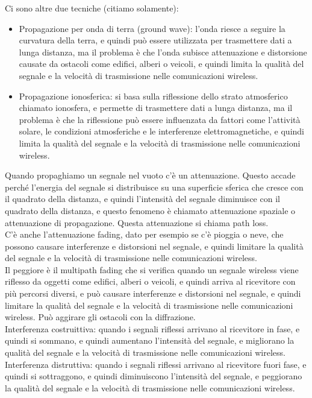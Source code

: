 Ci sono altre due tecniche (citiamo solamente):
\begin{itemize}
    \item Propagazione per onda di terra (ground wave): l'onda riesce a seguire la curvatura della terra, e quindi può essere utilizzata per trasmettere dati a lunga distanza, ma il problema è che l'onda subisce attenuazione e distorsione causate da ostacoli come edifici, alberi o veicoli, e quindi limita la qualità del segnale e la velocità di trasmissione nelle comunicazioni wireless.\\
    \item Propagazione ionosferica: si basa sulla riflessione dello strato atmosferico chiamato ionosfera, e permette di trasmettere dati a lunga distanza, ma il problema è che la riflessione può essere influenzata da fattori come l'attività solare, le condizioni atmosferiche e le interferenze elettromagnetiche, e quindi limita la qualità del segnale e la velocità di trasmissione nelle comunicazioni wireless.\\
\end{itemize}

Quando propaghiamo un segnale nel vuoto c'è un attenuazione. Questo accade perché l'energia del segnale si distribuisce su una superficie sferica che cresce con il quadrato della distanza, e quindi l'intensità del segnale diminuisce con il quadrato della distanza, e questo fenomeno è chiamato attenuazione spaziale o attenuazione di propagazione. Questa attenuazione si chiama path loss.\\

C'è anche l'attenuazione fading, dato per esempio se c'è pioggia o neve, che possono causare interferenze e distorsioni nel segnale, e quindi limitare la qualità del segnale e la velocità di trasmissione nelle comunicazioni wireless.\\

Il peggiore è il multipath fading che si verifica quando un segnale wireless viene riflesso da oggetti come edifici, alberi o veicoli, e quindi arriva al ricevitore con più percorsi diversi, e può causare interferenze e distorsioni nel segnale, e quindi limitare la qualità del segnale e la velocità di trasmissione nelle comunicazioni wireless. Può aggirare gli ostacoli con la diffrazione.\\

Interferenza costruittiva: quando i segnali riflessi arrivano al ricevitore in fase, e quindi si sommano, e quindi aumentano l'intensità del segnale, e migliorano la qualità del segnale e la velocità di trasmissione nelle comunicazioni wireless.\\
Interferenza distruttiva: quando i segnali riflessi arrivano al ricevitore fuori fase, e quindi si sottraggono, e quindi diminuiscono l'intensità del segnale, e peggiorano la qualità del segnale e la velocità di trasmissione nelle comunicazioni wireless.\\


